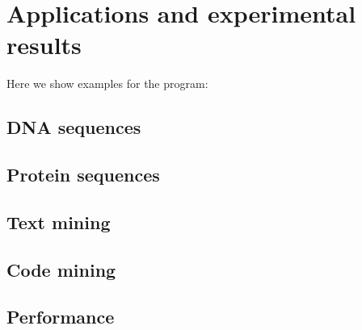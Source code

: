 \chapter{Applications and experimental results}

Here we show examples for the program:

\section{DNA sequences}


\section{Protein sequences}


\section{Text mining}


\section{Code mining}


\section{Performance}

